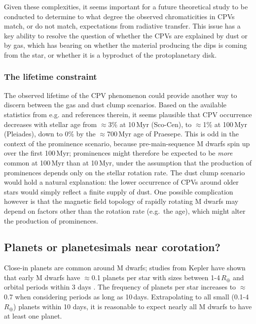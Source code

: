 \documentclass[11pt,twocolumn,tighten,linenumbers]{aastex63}
\begin{document}
Given these complexities, it seems important for a future theoretical
study to be conducted to determine to what degree the observed
chromaticities in CPVs match, or do not match, expectations from
radiative transfer.  This issue has a key ability to resolve the
question of whether the CPVs are explained by dust or by gas, which
has bearing on whether the material producing the dips is coming from
the star, or whether it is a byproduct of the protoplanetary disk.



\subsubsection{The lifetime constraint}

The observed lifetime of the CPV phenomenon could provide another way
to discern between the gas and dust clump scenarios.  Based on the
available statistics from e.g.  \citet{2022AJ....164...80R} and
references therein, it seems plausible that CPV occurrence decreases
with stellar age from $\approx$3\% at 10\,Myr (Sco-Cen), to
$\approx$1\% at 100\,Myr (Pleiades), down to 0\% by the
$\approx$700\,Myr age of Praesepe.  This is odd in the context of the
prominence scenario, because pre-main-sequence M dwarfs spin up over
the first 100\,Myr; prominences might therefore be expected to be {\it
more} common at 100\,Myr than at 10\,Myr, under the assumption that
the production of prominences depends only on the stellar rotation
rate.  The dust clump scenario would hold a natural explanation: the
lower occurrence of CPVs around older stars would simply reflect a
finite supply of dust.  One possible complication however is that the
magnetic field topology of rapidly rotating M dwarfs may depend on
factors other than the rotation rate (e.g.\ the age), which might
alter the production of prominences.


\subsection{Planets or planetesimals near corotation?}

Close-in planets are common around M dwarfs; studies from Kepler have
shown that early M dwarfs have $\approx$0.1 planets per star with
sizes between 1-4\,$R_\oplus$ and orbital periods within 3 days
\citep{2015ApJ...807...45D}.  The frequency of planets per star
increases to $\approx$0.7 when considering periods as long as
10\,days.  Extrapolating to all small (0.1-4\,$R_\oplus$) planets
within 10 days, it is reasonable to expect nearly all M dwarfs to have
at least one planet.
\end{document}
